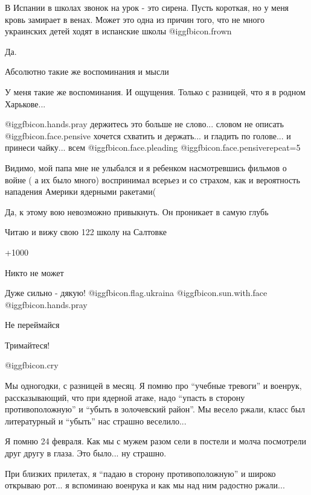 \begin{itemize}

В Испании в школах звонок на урок - это сирена. Пусть короткая, но у меня кровь
замирает в венах. Может это одна из причин того, что не много украинских детей
ходят в испанские школы  @igg{fbicon.frown} 

Да.

Абсолютно такие же воспоминания и мысли

У меня такие же воспоминания. И ощущения. Только с разницей, что я в родном Харькове...


 @igg{fbicon.hands.pray} держитесь это больше не слово... словом не описать  @igg{fbicon.face.pensive}  хочется схватить и
держать... и гладить по голове... и принеси чайку... всем  @igg{fbicon.face.pleading}  @igg{fbicon.face.pensive}{repeat=5} 


Видимо, мой папа мне не улыбался и я ребенком насмотревшись фильмов о войне ( а
их было много) воспринимал всерьез и со страхом, как и вероятность нападения
Америки ядерными ракетами(

Да, к этому вою невозможно привыкнуть. Он проникает в самую глубь

Читаю и вижу свою 122 школу на Салтовке

+1000

Никто не может

Дуже сильно - дякую! @igg{fbicon.flag.ukraina} @igg{fbicon.sun.with.face}  @igg{fbicon.hands.pray} 

Не переймайся

Тримайтеся!

 @igg{fbicon.cry} 


Мы одногодки, с разницей в месяц. Я помню про \enquote{учебные тревоги} и военрук,
рассказывающий, что при ядерной атаке, надо \enquote{упасть в сторону противоположную}
и \enquote{убыть в золочевский район}. Мы весело ржали, класс был литературный и
\enquote{убыть} нас страшно веселило...

Я помню 24 февраля. Как мы с мужем разом сели в постели и молча посмотрели друг
другу в глаза. Это было... ну страшно.

При близких прилетах, я \enquote{падаю в сторону противоположную} и широко открываю
рот... я вспоминаю военрука и как мы над ним радостно ржали...


\end{itemize}
